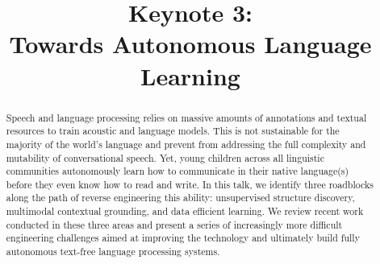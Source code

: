 \documentclass{article}
\title{Keynote 3:\\Towards Autonomous Language Learning}
\begin{document}
\maketitle
\thispagestyle{empty}
\begin{abstract}
Speech and language processing relies on massive amounts of annotations and textual resources to train acoustic and language models. This is not sustainable for the majority of the world's language and prevent from addressing the full complexity and mutability of conversational speech. Yet, young children across all linguistic communities autonomously learn how to communicate in their native language(s) before they even know how to read and write. In this talk, we identify three roadblocks along the path of reverse engineering this ability: unsupervised structure discovery, multimodal contextual grounding, and data efficient learning. We review recent work conducted in these three areas and present a series of increasingly more difficult engineering challenges aimed at improving the technology and ultimately build fully autonomous text-free language processing systems.
\end{abstract}
\vfill{}
\end{document}
